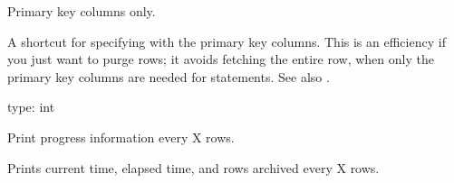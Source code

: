 \documentclass[letterpaper,10pt,english]{sphinxmanual}
\begin{document}

\begin{fulllineitems}
\label{\detokenize{mariadb-archiver:cmdoption-mariadb-archiver-primary-key-only}}
\sphinxAtStartPar
Primary key columns only.

\sphinxAtStartPar
A shortcut for specifying {\hyperref[\detokenize{mariadb-archiver:cmdoption-mariadb-archiver-columns}]{}} with the primary key columns.  This is
an efficiency if you just want to purge rows; it avoids fetching the entire row,
when only the primary key columns are needed for  statements.  See also
{\hyperref[\detokenize{mariadb-archiver:cmdoption-mariadb-archiver-purge}]{}}.

\end{fulllineitems}


\begin{fulllineitems}
\label{\detokenize{mariadb-archiver:cmdoption-mariadb-archiver-progress}}
\sphinxAtStartPar
type: int

\sphinxAtStartPar
Print progress information every X rows.

\sphinxAtStartPar
Prints current time, elapsed time, and rows archived every X rows.

\end{fulllineitems}
\end{document}

